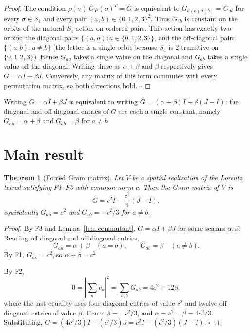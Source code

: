 \documentclass[twocolumn]{iopjournal}
\newtheorem{theorem}[lemma]{Theorem}
\theoremstyle{definition}
\begin{document}
\begin{proof}
The condition $\rho(\sigma)\,G\,\rho(\sigma)^T = G$ is equivalent
to $G_{\sigma(a)\sigma(b)} = G_{ab}$ for every $\sigma \in S_4$ and
every pair $(a, b) \in \{0, 1, 2, 3\}^2$.  Thus $G_{ab}$ is constant
on the orbits of the natural $S_4$ action on ordered pairs.  This
action has exactly two orbits: the diagonal pairs $\{(a,a) : a \in
\{0,1,2,3\}\}$, and the off-diagonal pairs $\{(a,b) : a \neq b\}$
(the latter is a single orbit because $S_4$ is $2$-transitive on
$\{0,1,2,3\}$).  Hence $G_{aa}$ takes a single value on the diagonal
and $G_{ab}$ takes a single value off the diagonal.  Writing these
as $\alpha + \beta$ and $\beta$ respectively gives
$G = \alpha I + \beta J$.  Conversely, any matrix of this form
commutes with every permutation matrix, so both directions hold.
\hfill$\square$
\end{proof}

\noindent
Writing $G = \alpha I + \beta J$ is equivalent to writing
$G = (\alpha + \beta)I + \beta(J - I)$: the diagonal and off-diagonal
entries of $G$ are each a single constant, namely $G_{aa} =
\alpha + \beta$ and $G_{ab} = \beta$ for $a \neq b$.


\section*{Main result}

\begin{theorem}[Forced Gram matrix]
\label{thm:forced}
Let $V$ be a spatial realization of the Lorentz tetrad
satisfying F1--F3 with common norm $c$.  Then the Gram matrix of $V$ is
\begin{equation}
  G = c^2 I - \frac{c^2}{3}(J - I),
  \label{eq:forced_gram}
\end{equation}
equivalently $G_{aa} = c^2$ and $G_{ab} = -c^2/3$ for $a \neq b$.
\end{theorem}

\begin{proof}
By F3 and Lemma~\ref{lem:commutant}, $G = \alpha I + \beta J$ for
some scalars $\alpha, \beta$.  Reading off diagonal and off-diagonal
entries,
\[
  G_{aa} = \alpha + \beta \quad (a = b), \qquad
  G_{ab} = \beta \quad (a \neq b).
\]
By F1, $G_{aa} = c^2$, so $\alpha + \beta = c^2$.

By F2,
\begin{equation}
  0 = \left|\sum_{a} v_a\right|^2
    = \sum_{a,b} G_{ab}
    = 4 c^2 + 12 \beta,
  \label{eq:closure_beta}
\end{equation}
where the last equality uses four diagonal entries of value $c^2$
and twelve off-diagonal entries of value $\beta$.  Hence
$\beta = -c^2/3$, and $\alpha = c^2 - \beta = 4c^2/3$.  Substituting,
$G = (4c^2/3)I - (c^2/3)J = c^2 I - (c^2/3)(J - I)$.
\hfill$\square$
\end{proof}
\end{document}

